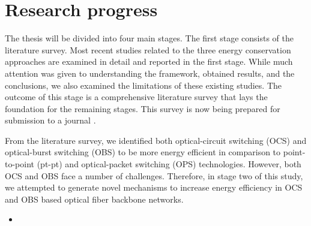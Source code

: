 \documentclass{article}
\begin{document}
\section{Research progress}
The thesis will be divided into four main stages. The first stage consists of the literature survey. Most recent studies related to the three energy conservation approaches are examined in detail and reported in the first stage. While much attention was given to understanding the framework, obtained results, and the conclusions, we also examined the limitations of these existing studies. The outcome of this stage is a comprehensive literature survey that lays the foundation for the remaining stages. This survey is now being prepared for submission to a journal \cite{Dharmaweera2012b}.

From the literature survey, we identified both optical-circuit switching (OCS) and optical-burst switching (OBS) to be more energy efficient in comparison to point-to-point (pt-pt) and optical-packet switching (OPS) technologies. However, both OCS and OBS face a number of challenges. Therefore, in stage two of this study, we attempted to generate novel mechanisms to increase energy efficiency in OCS and OBS based optical fiber backbone networks. 
\begin{itemize}
\item 
\end{itemize}
\end{document}
